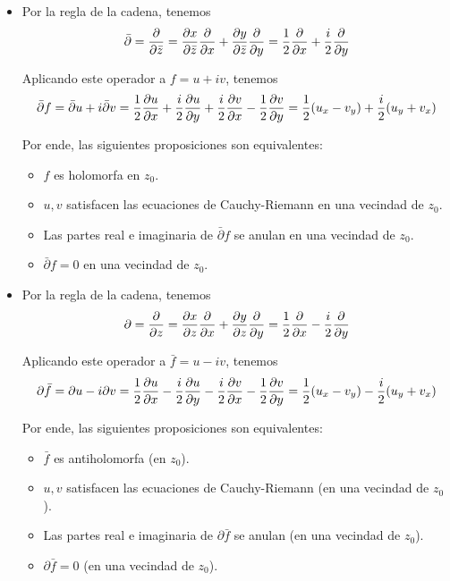 \begin{solution}
\leavevmode
\begin{itemize}
    \item Por la regla de la cadena, tenemos
    $$
    \bar \partial
        = \frac {\partial } {\partial \bar z}
        = \frac {\partial x} {\partial \bar z} \frac {\partial } {\partial x} + \frac {\partial y} {\partial \bar z} \frac {\partial } {\partial y}
        = \frac 12 \frac {\partial } {\partial x} + \frac i2 \frac {\partial } {\partial y}
    $$
    
    Aplicando este operador a $f = u + iv$, tenemos
    $$
    \bar \partial f
        = \bar \partial u + i \bar \partial v
        = \frac 12 \frac {\partial u} {\partial x} + \frac i2 \frac {\partial u} {\partial y} + \frac i2 \frac {\partial v} {\partial x} - \frac 12 \frac {\partial v} {\partial y}
        = \frac 12 (u_x - v_y) + \frac i2 (u_y + v_x)
    $$
    
    Por ende, las siguientes proposiciones son equivalentes:
    \begin{itemize}
        \item $f$ es holomorfa en $z_0$.
        \item $u, v$ satisfacen las ecuaciones de Cauchy-Riemann en una vecindad de $z_0$.
        \item Las partes real e imaginaria de $\bar \partial f$ se anulan en una vecindad de $z_0$.
        \item $\bar \partial f = 0$ en una vecindad de $z_0$.
    \end{itemize}
    
    \item Por la regla de la cadena, tenemos
    $$
    \partial
        = \frac {\partial } {\partial z}
        = \frac {\partial x} {\partial z} \frac {\partial } {\partial x} + \frac {\partial y} {\partial z} \frac {\partial } {\partial y}
        = \frac 12 \frac {\partial } {\partial x} - \frac i2 \frac {\partial } {\partial y}
    $$
    
    Aplicando este operador a $\bar f = u - iv$, tenemos
    $$
    \partial \bar f
        = \partial u - i \partial v
        = \frac 12 \frac {\partial u} {\partial x} - \frac i2 \frac {\partial u} {\partial y} - \frac i2 \frac {\partial v} {\partial x} - \frac 12 \frac {\partial v} {\partial y}
        = \frac 12 (u_x - v_y) - \frac i2 (u_y + v_x)
    $$
    
    Por ende, las siguientes proposiciones son equivalentes:
    \begin{itemize}
        \item $\bar f$ es antiholomorfa (en $z_0$).
        \item $u, v$ satisfacen las ecuaciones de Cauchy-Riemann (en una vecindad de $z_0$).
        \item Las partes real e imaginaria de $\partial \bar f$ se anulan (en una vecindad de $z_0$).
        \item $\partial \bar f = 0$ (en una vecindad de $z_0$).
    \end{itemize}
\end{itemize}
\end{solution}
